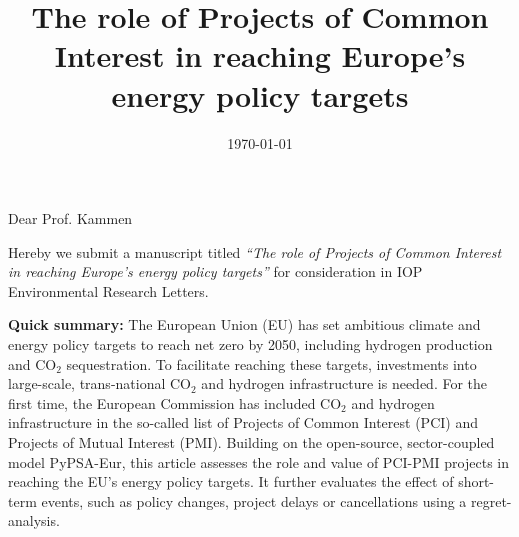 \documentclass[10pt,a4paper,roman]{moderncv}        %
\title{The role of Projects of Common Interest in reaching Europe's energy policy targets}
\begin{document}
\date{\today}
\opening{Dear Prof. Kammen}
\makelettertitle
\justifying
Hereby we submit a manuscript titled \textit{\enquote{The role of Projects of Common Interest in reaching Europe's energy policy targets}} for consideration in IOP Environmental Research Letters. 

\textbf{Quick summary:} The European Union (EU) has set ambitious climate and energy policy targets to reach net zero by 2050, including hydrogen production and CO$_2$ sequestration. To facilitate reaching these targets, investments into large-scale, trans-national CO$_2$ and hydrogen infrastructure is needed. For the first time, the European Commission has included CO$_2$ and hydrogen infrastructure in the so-called list of Projects of Common Interest (PCI) and Projects of Mutual Interest (PMI). Building on the open-source, sector-coupled model PyPSA-Eur, this article assesses the role and value of PCI-PMI projects in reaching the EU's energy policy targets. It further evaluates the effect of short-term events, such as policy changes, project delays or cancellations using a regret-analysis.
\end{document}
